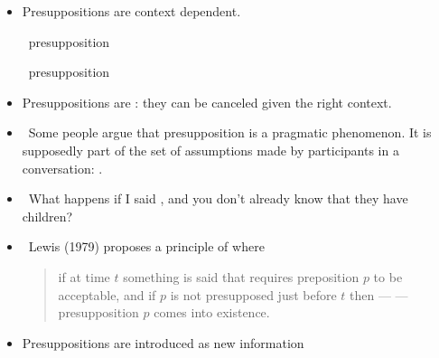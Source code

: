 \documentclass[headrule,footrule]{foils}
\begin{document}
\begin{itemize}
\item  Presuppositions are context dependent. 
\begin{exe}
    \ex \begin{xlist}
      \ex {}
      \ex   \hfill presupposition
    \end{xlist}
 \ex \begin{xlist}
   \ex {}
   \ex   \hfill presupposition
 \end{xlist}
\end{exe}
\item Presuppositions are : they can be canceled
  given the right context.

\end{itemize}

\begin{itemize}
\item  Some people argue that presupposition is a pragmatic
phenomenon. It is supposedly part of the set of assumptions
made by participants in a conversation: .
\item  What happens if I said , and you don’t
already know that they have children?
\item  Lewis (1979) proposes a principle of  where 
  \begin{quote}
    if at time $t$ something is said that requires preposition $p$ to
    be acceptable, and if $p$ is not presupposed just before $t$ then
    ---  --- presupposition $p$ comes into existence.
\end{quote}
\item Presuppositions are introduced as new information
\end{itemize}
\end{document}
